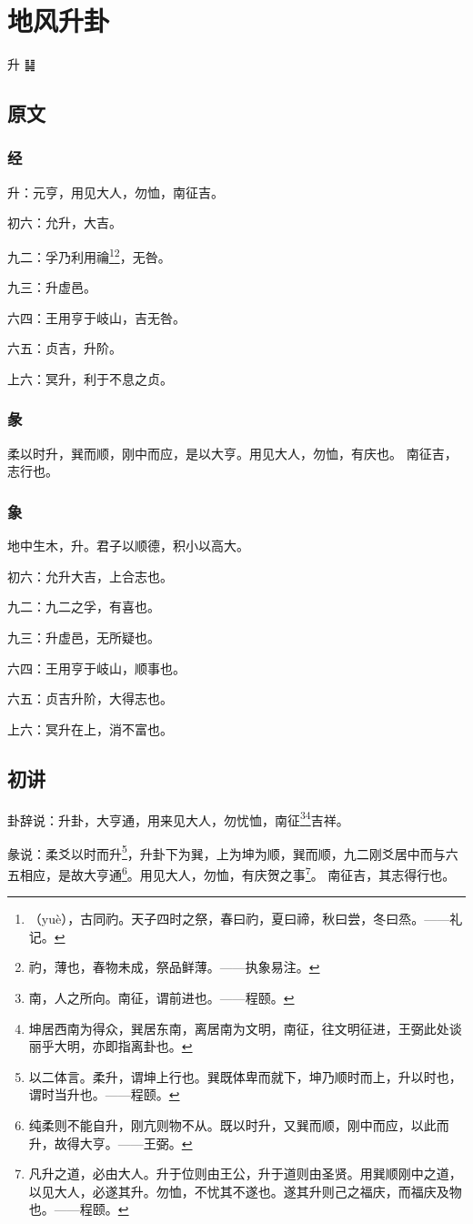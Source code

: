 \documentclass[12pt,oneside]{book}
\begin{document}
\chapter{地风升卦}
升 {\Large ䷭}

\section{原文}

\subsection{经}
升：元亨，用见大人，勿恤，南征吉。

初六：允升，大吉。

九二：孚乃利用禴\footnote{（yuè），古同礿。天子四时之祭，春曰礿，夏曰禘，秋曰尝，冬曰烝。——礼记。}\footnote{礿，薄也，春物未成，祭品鲜薄。——执象易注。}，无咎。

九三：升虚邑。

六四：王用亨于岐山，吉无咎。

六五：贞吉，升阶。

上六：冥升，利于不息之贞。


\subsection{彖}
柔以时升，巽而顺，刚中而应，是以大亨。用见大人，勿恤，有庆也。 南征吉，志行也。

\subsection{象}
地中生木，升。君子以顺德，积小以高大。

初六：允升大吉，上合志也。

九二：九二之孚，有喜也。

九三：升虚邑，无所疑也。

六四：王用亨于岐山，顺事也。

六五：贞吉升阶，大得志也。

上六：冥升在上，消不富也。

\section{初讲}
卦辞说：升卦，大亨通，用来见大人，勿忧恤，南征\footnote{南，人之所向。南征，谓前进也。——程颐。}\footnote{坤居西南为得众，巽居东南，离居南为文明，南征，往文明征进，王弼此处谈丽乎大明，亦即指离卦也。}吉祥。

彖说：柔爻以时而升\footnote{以二体言。柔升，谓坤上行也。巽既体卑而就下，坤乃顺时而上，升以时也，谓时当升也。——程颐。}，升卦下为巽，上为坤为顺，巽而顺，九二刚爻居中而与六五相应，是故大亨通\footnote{纯柔则不能自升，刚亢则物不从。既以时升，又巽而顺，刚中而应，以此而升，故得大亨。——王弼。}。用见大人，勿恤，有庆贺之事\footnote{凡升之道，必由大人。升于位则由王公，升于道则由圣贤。用巽顺刚中之道，以见大人，必遂其升。勿恤，不忧其不遂也。遂其升则己之福庆，而福庆及物也。——程颐。 }。 南征吉，其志得行也。
\end{document}
